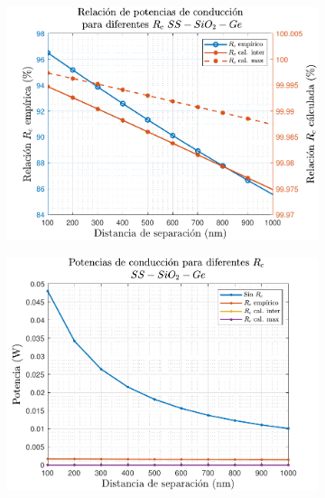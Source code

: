 \begin{figure}[H]
	\centering
	\begin{subfigure}[b]{0.49\textwidth}
		\centering
			\includegraphics[width=1.00\textwidth]{figuras/Resultados/conduccion/pdf/relPrcs_SsSiO2Ge.pdf}
		\caption{ }
		\label{fig:relPrcs_SsSiO2Ge}
	\end{subfigure}
	\hfill
	\begin{subfigure}[b]{0.49\textwidth}
		\centering
			\includegraphics[width=1.00\textwidth]{figuras/Resultados/conduccion/pdf/Prcs_SsSiO2Ge.pdf}
		\caption{ }
		\label{fig:Prcs_SsSiO2Ge}
	\end{subfigure}
	\caption{ }
	\label{fig:Pcond_SsSiO2Ge}
\end{figure}

